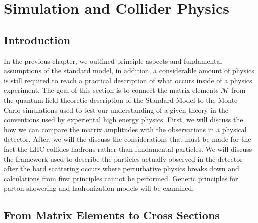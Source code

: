 \chapter{Simulation and Collider Physics}

\section{Introduction}

In the previous chapter, we outlined principle aspects and fundamental assumptions of the  standard model, 
in addition, a considerable amount of physics is still required to reach a practical
 description of what occurs inside of a physics experiment. The goal of this section is
 to connect the matrix elements $\mathcal{M}$ from the quantum field
theoretic description  of the Standard Model to the Monte Carlo simulations used to test our understanding of 
a given theory in the conventions used by experiental high energy physics. First, we will discuss the how
we can compare the matrix amplitudes with the observations in a physical detector. 
After, we will the discuss the considerations that must be made for the fact the
 LHC collides hadrons rather than fundamental particles. We will discuss the
 framework used to describe the particles actually observed in the detector after the
 hard scattering occurs where perturbative physics breaks down and  calculations from first
principles cannot be performed. Generic principles for parton showering and hadronization
 models will be examined. 

\section{From Matrix Elements to Cross Sections} 

